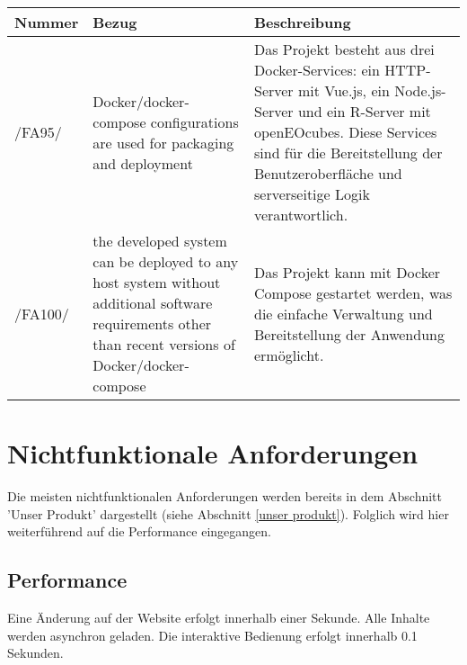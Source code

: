 \documentclass[a4paper,12pt]{article}
\newcommand{\addrow}[3]{#1 &#2 &#3 \\ [0.2cm]}
\newcommand{\addheading}[3]{#1 &#2 &#3\\ \hline }
\newcommand{\tabularhead}{\begin{tabular}{l p{5cm} p{8cm}}
\hline
}
\newenvironment{usecase}{\tabularhead}
{\hline\end{tabular}}
\begin{document}
\begin{usecase}

  \addheading{Nummer}{Bezug}{Beschreibung} 
  \addrow{/FA95/}{Docker/docker-compose configurations are used for packaging and deployment}{Das Projekt besteht aus drei Docker-Services: ein HTTP-Server mit Vue.js, ein Node.js-Server und ein R-Server mit openEOcubes. Diese Services sind für die Bereitstellung der Benutzeroberfläche und  serverseitige Logik verantwortlich.}
  \addrow{/FA100/}{the developed system can be deployed to any host system without additional
software requirements other than recent versions of Docker/docker-compose}{Das Projekt kann mit Docker Compose gestartet werden, was die einfache Verwaltung und Bereitstellung der Anwendung ermöglicht.}

\end{usecase}

\section{Nichtfunktionale Anforderungen}
Die meisten nichtfunktionalen Anforderungen werden bereits in dem Abschnitt 'Unser Produkt' dargestellt (siehe Abschnitt \ref{unser produkt}). Folglich wird hier weiterführend auf die Performance eingegangen.
\subsection{Performance}
Eine Änderung auf der Website erfolgt innerhalb einer Sekunde. Alle Inhalte werden asynchron geladen. Die interaktive Bedienung erfolgt innerhalb 0.1 Sekunden.

\end{document}
